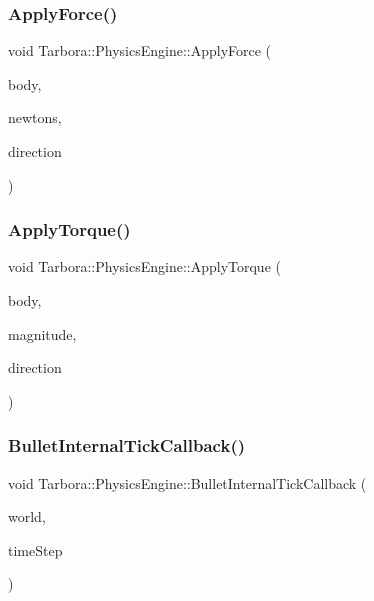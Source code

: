 \subsubsection{\texorpdfstring{Apply\+Force()}{ApplyForce()}}
{\footnotesize\ttfamily void Tarbora\+::\+Physics\+Engine\+::\+Apply\+Force (\begin{DoxyParamCaption}\item[{bt\+Rigid\+Body $\ast$}]{body,  }\item[{float}]{newtons,  }\item[{const glm\+::vec3 \&}]{direction }\end{DoxyParamCaption})}

\mbox{\label{namespaceTarbora_1_1PhysicsEngine_a7bfaabd962f0825536195708d4442a3d}} 
\subsubsection{\texorpdfstring{Apply\+Torque()}{ApplyTorque()}}
{\footnotesize\ttfamily void Tarbora\+::\+Physics\+Engine\+::\+Apply\+Torque (\begin{DoxyParamCaption}\item[{bt\+Rigid\+Body $\ast$}]{body,  }\item[{float}]{magnitude,  }\item[{const glm\+::vec3 \&}]{direction }\end{DoxyParamCaption})}

\mbox{\label{namespaceTarbora_1_1PhysicsEngine_ad4662a4ef3aac14f8a53fffc5689be89}} 
\subsubsection{\texorpdfstring{Bullet\+Internal\+Tick\+Callback()}{BulletInternalTickCallback()}}
{\footnotesize\ttfamily void Tarbora\+::\+Physics\+Engine\+::\+Bullet\+Internal\+Tick\+Callback (\begin{DoxyParamCaption}\item[{bt\+Dynamics\+World $\ast$const}]{world,  }\item[{bt\+Scalar const}]{time\+Step }\end{DoxyParamCaption})}

